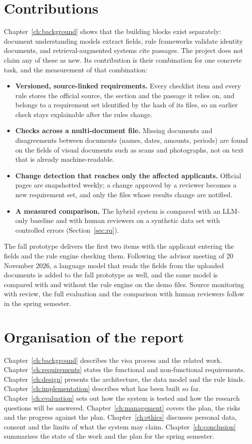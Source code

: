 \section{Contributions}
Chapter~\ref{ch:background} shows that the building blocks exist separately: document
understanding models extract fields, rule frameworks validate identity documents, and
retrieval-augmented systems cite passages. The project does not claim any of these as new. Its
contribution is their combination for one concrete task, and the measurement of that combination:
\begin{itemize}
  \item \textbf{Versioned, source-linked requirements.} Every checklist item and every rule
    stores the official source, the section and the passage it relies on, and belongs to a
    requirement set identified by the hash of its files, so an earlier check stays explainable
    after the rules change.
  \item \textbf{Checks across a multi-document file.} Missing documents and disagreements between
    documents (names, dates, amounts, periods) are found on the fields of visual documents such as
    scans and photographs, not on text that is already machine-readable.
  \item \textbf{Change detection that reaches only the affected applicants.} Official pages are
    snapshotted weekly; a change approved by a reviewer becomes a new requirement set, and only
    the files whose results change are notified.
  \item \textbf{A measured comparison.} The hybrid system is compared with an LLM-only baseline
    and with human reviewers on a synthetic data set with controlled errors
    (Section~\ref{sec:rq}).
\end{itemize}
The fall prototype delivers the first two items with the applicant entering the fields and the
rule engine checking them. Following the advisor meeting of 20 November 2026, a language model
that reads the fields from the uploaded documents is added to the fall prototype as well, and the
same model is compared with and without the rule engine on the demo files. Source monitoring with
review, the full evaluation and the comparison with human reviewers follow in the spring
semester.

\section{Organisation of the report}
Chapter~\ref{ch:background} describes the visa process and the related work.
Chapter~\ref{ch:requirements} states the functional and non-functional requirements.
Chapter~\ref{ch:design} presents the architecture, the data model and the rule kinds.
Chapter~\ref{ch:implementation} describes what has been built so far.
Chapter~\ref{ch:evaluation} sets out how the system is tested and how the research questions will
be answered. Chapter~\ref{ch:management} covers the plan, the risks and the progress against the
plan. Chapter~\ref{ch:ethics} discusses personal data, consent and the limits of what the system
may claim. Chapter~\ref{ch:conclusion} summarises the state of the work and the plan for the
spring semester.
